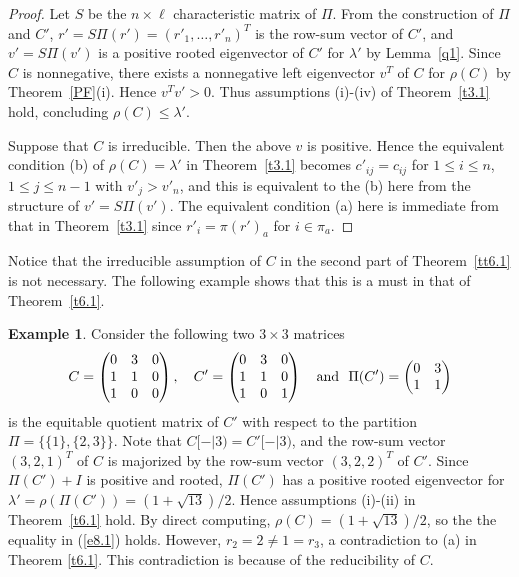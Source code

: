 \documentclass[final,3p, times, 12pt]{elsarticle}
\theoremstyle{plain}
\theoremstyle{definition}
\newtheorem{exam}[thm]{Example}
\theoremstyle{remark}
\numberwithin{equation}{section}
\begin{document}
\begin{proof} Let $S$ be the $n\times \ell$ characteristic matrix of $\Pi.$
 From the construction of $\Pi$ and $C'$, $r'=S\Pi(r')=(r'_1,\ldots,r'_n)^T$ is the row-sum vector of $C'$, and
 $v'=S\Pi(v')$ is a positive rooted eigenvector of $C'$ for $\lambda'$  by Lemma~\ref{q1}. Since $C$ is nonnegative, there exists  a nonnegative left eigenvector $v^T$ of $C$ for $\rho(C)$ by Theorem~\ref{PF}(i).
  Hence $v^Tv'>0$.
   Thus assumptions (i)-(iv) of Theorem~\ref{t3.1} hold, concluding $\rho(C)\leq \lambda'$.

   Suppose that $C$ is irreducible. Then the above $v$ is positive. Hence the equivalent condition (b) of $\rho(C)=\lambda'$ in Theorem~\ref{t3.1} becomes
  $c'_{ij}=c_{ij}$ for $1\leq i\leq n$,$1\leq j\leq n-1$ with $v'_j>v'_n$, and this is equivalent to the (b) here from the structure of  $v'=S\Pi(v')$.
  The equivalent condition (a) here is immediate from that in Theorem~\ref{t3.1} since $r'_i=\pi(r')_a$ for $i\in\pi_a$.
\end{proof}




Notice that the irreducible assumption of $C$ in the second part of Theorem~\ref{tt6.1} is not necessary.
The following example shows that this is a must in that of Theorem~\ref{t6.1}.

 \begin{exam}
 Consider the following two $3\times 3$ matrices
 $$C=\begin{pmatrix}
 0 & 3 & 0 \\
 1 &  1 & 0\\
 1 & 0 & 0
 \end{pmatrix},\quad   C'=\begin{pmatrix}
 0 & 3 & 0 \\
 1 &  1 & 0\\
 1 & 0 & 1
 \end{pmatrix}\quad  {\rm and~~ }\Pi(C')=\begin{pmatrix} 0 & 3\\ 1 & 1 \end{pmatrix}$$
 is the equitable quotient matrix of $C'$  with respect to the partition $\Pi=\{\{1\}, \{2, 3\}\}.$
  Note that $C[-|3)= C'[-|3)$, and the row-sum vector $(3, 2, 1)^T$ of $C$ is majorized by the row-sum vector $(3, 2, 2)^T$ of $C'$.
 Since $\Pi(C')+I$ is positive and rooted, $\Pi(C')$ has a positive rooted eigenvector for $\lambda'=\rho(\Pi(C'))=(1+\sqrt{13})/2.$
 Hence assumptions (i)-(ii) in Theorem~\ref{t6.1} hold. By direct computing, $\rho(C)=(1+\sqrt{13})/2$, so the the equality in
(\ref{e8.1}) holds.  However, $r_2=2\not=1=r_3$, a contradiction to (a) in Theorem \ref{t6.1}.
 This contradiction is because of the reducibility of $C$.
 \end{exam}
\end{document}
